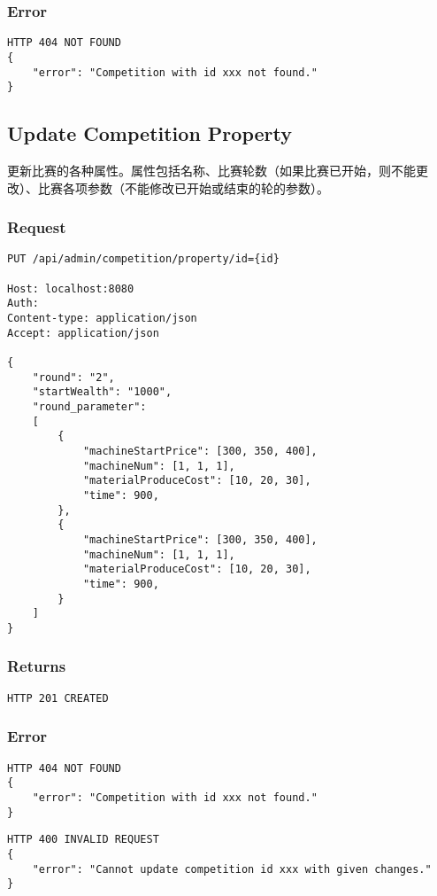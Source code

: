 \documentclass{article}
\begin{document}
\subsubsection*{Error}
\begin{lstlisting}
HTTP 404 NOT FOUND
{
    "error": "Competition with id xxx not found."
}
\end{lstlisting}

\subsection{Update Competition Property}

更新比赛的各种属性。属性包括名称、比赛轮数（如果比赛已开始，则不能更改）、比赛各项参数（不能修改已开始或结束的轮的参数）。

\subsubsection*{Request}
\begin{lstlisting}
PUT /api/admin/competition/property/id={id}

Host: localhost:8080
Auth:
Content-type: application/json
Accept: application/json

{
    "round": "2",
    "startWealth": "1000",
    "round_parameter":
    [
        {
            "machineStartPrice": [300, 350, 400],
            "machineNum": [1, 1, 1],
            "materialProduceCost": [10, 20, 30],
            "time": 900,
        },
        {
            "machineStartPrice": [300, 350, 400],
            "machineNum": [1, 1, 1],
            "materialProduceCost": [10, 20, 30],
            "time": 900,
        }
    ]
}
\end{lstlisting}

\subsubsection*{Returns}
\begin{lstlisting}
HTTP 201 CREATED
\end{lstlisting}

\subsubsection*{Error}
\begin{lstlisting}
HTTP 404 NOT FOUND
{
    "error": "Competition with id xxx not found."
}
\end{lstlisting}

\begin{lstlisting}
HTTP 400 INVALID REQUEST
{
    "error": "Cannot update competition id xxx with given changes."
}
\end{lstlisting}
\end{document}
